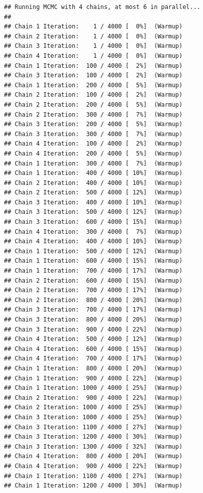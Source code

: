\documentclass[
]{article}
\begin{document}
\begin{verbatim}
## Running MCMC with 4 chains, at most 6 in parallel...
## 
## Chain 1 Iteration:    1 / 4000 [  0%]  (Warmup) 
## Chain 2 Iteration:    1 / 4000 [  0%]  (Warmup) 
## Chain 3 Iteration:    1 / 4000 [  0%]  (Warmup) 
## Chain 4 Iteration:    1 / 4000 [  0%]  (Warmup) 
## Chain 1 Iteration:  100 / 4000 [  2%]  (Warmup) 
## Chain 3 Iteration:  100 / 4000 [  2%]  (Warmup) 
## Chain 1 Iteration:  200 / 4000 [  5%]  (Warmup) 
## Chain 2 Iteration:  100 / 4000 [  2%]  (Warmup) 
## Chain 2 Iteration:  200 / 4000 [  5%]  (Warmup) 
## Chain 2 Iteration:  300 / 4000 [  7%]  (Warmup) 
## Chain 3 Iteration:  200 / 4000 [  5%]  (Warmup) 
## Chain 3 Iteration:  300 / 4000 [  7%]  (Warmup) 
## Chain 4 Iteration:  100 / 4000 [  2%]  (Warmup) 
## Chain 4 Iteration:  200 / 4000 [  5%]  (Warmup) 
## Chain 1 Iteration:  300 / 4000 [  7%]  (Warmup) 
## Chain 1 Iteration:  400 / 4000 [ 10%]  (Warmup) 
## Chain 2 Iteration:  400 / 4000 [ 10%]  (Warmup) 
## Chain 2 Iteration:  500 / 4000 [ 12%]  (Warmup) 
## Chain 3 Iteration:  400 / 4000 [ 10%]  (Warmup) 
## Chain 3 Iteration:  500 / 4000 [ 12%]  (Warmup) 
## Chain 3 Iteration:  600 / 4000 [ 15%]  (Warmup) 
## Chain 4 Iteration:  300 / 4000 [  7%]  (Warmup) 
## Chain 4 Iteration:  400 / 4000 [ 10%]  (Warmup) 
## Chain 1 Iteration:  500 / 4000 [ 12%]  (Warmup) 
## Chain 1 Iteration:  600 / 4000 [ 15%]  (Warmup) 
## Chain 1 Iteration:  700 / 4000 [ 17%]  (Warmup) 
## Chain 2 Iteration:  600 / 4000 [ 15%]  (Warmup) 
## Chain 2 Iteration:  700 / 4000 [ 17%]  (Warmup) 
## Chain 2 Iteration:  800 / 4000 [ 20%]  (Warmup) 
## Chain 3 Iteration:  700 / 4000 [ 17%]  (Warmup) 
## Chain 3 Iteration:  800 / 4000 [ 20%]  (Warmup) 
## Chain 3 Iteration:  900 / 4000 [ 22%]  (Warmup) 
## Chain 4 Iteration:  500 / 4000 [ 12%]  (Warmup) 
## Chain 4 Iteration:  600 / 4000 [ 15%]  (Warmup) 
## Chain 4 Iteration:  700 / 4000 [ 17%]  (Warmup) 
## Chain 1 Iteration:  800 / 4000 [ 20%]  (Warmup) 
## Chain 1 Iteration:  900 / 4000 [ 22%]  (Warmup) 
## Chain 1 Iteration: 1000 / 4000 [ 25%]  (Warmup) 
## Chain 2 Iteration:  900 / 4000 [ 22%]  (Warmup) 
## Chain 2 Iteration: 1000 / 4000 [ 25%]  (Warmup) 
## Chain 3 Iteration: 1000 / 4000 [ 25%]  (Warmup) 
## Chain 3 Iteration: 1100 / 4000 [ 27%]  (Warmup) 
## Chain 3 Iteration: 1200 / 4000 [ 30%]  (Warmup) 
## Chain 3 Iteration: 1300 / 4000 [ 32%]  (Warmup) 
## Chain 4 Iteration:  800 / 4000 [ 20%]  (Warmup) 
## Chain 4 Iteration:  900 / 4000 [ 22%]  (Warmup) 
## Chain 1 Iteration: 1100 / 4000 [ 27%]  (Warmup) 
## Chain 1 Iteration: 1200 / 4000 [ 30%]  (Warmup) 

\end{verbatim}
\end{document}

